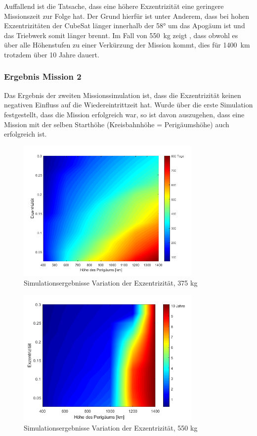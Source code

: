 	Auffallend ist die Tatsache, dass eine höhere Exzentrizität eine geringere Missionszeit zur Folge hat. Der Grund hierfür ist unter Anderem, dass bei hohen Exzentrizitäten der CubeSat länger innerhalb der \num{58}° um das Apogäum ist und das Triebwerk somit länger brennt. Im Fall von \SI{550}{\kilogram} zeigt , dass obwohl es über alle Höhenstufen zu einer Verkürzung der Mission kommt, dies für \SI{1400}{\kilo\metre} trotzdem über \num{10} Jahre dauert. 
\subsubsection{Ergebnis Mission 2}
Das Ergebnis der zweiten Missionssimulation ist, dass die Exzentrizität keinen negativen Einfluss auf die Wiedereintrittzeit hat. Wurde über die erste Simulation festgestellt, dass die Mission erfolgreich war, so ist davon auszugehen, dass eine Mission mit der selben Starthöhe (Kreisbahnhöhe = Perigäumshöhe) auch erfolgreich ist.

	
	\begin{figure}[t]
	\centering
		\includegraphics[width=0.80\textwidth]{./graphics/GMAT/ecc_perigee_375kg.png}
		\caption{Simulationsergebnisse Variation der Exzentrizität, 375 kg}
	\label{fig:GMAT_ecc_b}
\end{figure}

\begin{figure}[H]
	\centering
		\includegraphics[width=0.80\textwidth]{./graphics/GMAT/ecc_perigee_550kg.png}
		\caption{Simulationsergebnisse Variation der Exzentrizität, 550 kg}
	\label{fig:GMAT_ecc_c}
\end{figure}


